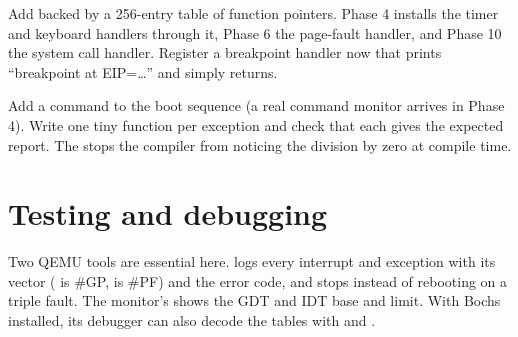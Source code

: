 \documentclass[11pt,a4paper]{article}
\begin{document}
Add  backed by a 256-entry table of function
pointers. Phase 4 installs the timer and keyboard handlers through it, Phase 6 the page-fault handler, and Phase 10
the system call handler. Register a breakpoint handler now that prints ``breakpoint at EIP=\dots'' and simply
returns.

Add a  command to the boot sequence (a real command monitor arrives in Phase 4). Write one tiny
function per exception and check that each gives the expected report. The  stops the compiler from
noticing the division by zero at compile time.


\section{Testing and debugging}

Two QEMU tools are essential here.  logs every interrupt and exception with its vector
( is \#GP,  is \#PF) and the error code, and stops instead of rebooting on a triple fault. The
monitor's  shows the GDT and IDT base and limit. With Bochs installed, its debugger can also
decode the tables with  and .
\end{document}
